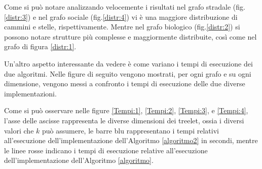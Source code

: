 Come si può notare analizzando velocemente i risultati nel grafo stradale (fig.\ref{distr:3}) e nel grafo sociale (fig.\ref{distr:4}) vi è una maggiore distribuzione di cammini e stelle, rispettivamente.
Mentre nel grafo biologico (fig.\ref{distr:2}) si possono notare strutture più complesse e maggiormente distribuite, così come nel grafo di figura \ref{distr:1}.

Un'altro aspetto interessante da vedere è come variano i tempi di esecuzione dei due algoritmi.
Nelle figure di seguito vengono mostrati, per ogni grafo e su ogni dimensione,
vengono messi a confronto i tempi di esecuzione delle due diverse implementazioni.

Come si può osservare nelle figure \ref{Tempi:1}, \ref{Tempi:2}, \ref{Tempi:3}, e \ref{Tempi:4}, l'asse delle ascisse rappresenta le diverse dimensioni dei treelet, ossia i diversi valori che $ k $ può assumere, le barre blu rappresentano i tempi relativi all'esecuzione dell'implementazione dell'Algoritmo \ref{algoritmo2} in secondi,
mentre le linee rosse indicano i tempi di esecuzione relative all'esecuzione dell'implementazione dell'Algoritmo \ref{algoritmo}.

